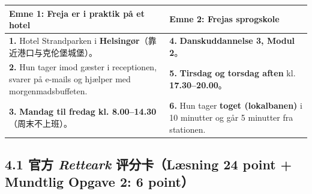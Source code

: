 \begin{tcolorbox}[enhanced, unbreakable, colback=NCDBgGray, colframe=NCDGray, coltitle=white, fonttitle=\bfseries, title={Kursist B Ark — Case: Freja（回答方专用 · 事实信息卡片，请遮盖 A 卡作答）}, arc=2pt, boxrule=0.8pt, borderline west={3pt}{0pt}{NCDRed}, left=10pt, right=10pt, top=7pt, bottom=7pt]
\small
\renewcommand{\arraystretch}{1.3}
\begin{tabularx}{\linewidth}{@{} >{\raggedright\arraybackslash}X @{\hspace{0.5cm}} >{\raggedright\arraybackslash}X @{}}
\toprule
\textbf{\color{NCDTeal}Emne 1: Freja er i praktik på et hotel} & \textbf{\color{NCDTeal}Emne 2: Frejas sprogskole} \\
\midrule
\textbf{1.} Hotel Strandparken i \textbf{Helsingør}（靠近港口与克伦堡城堡）。 &
\textbf{4.} \textbf{Danskuddannelse 3, Modul 2}。 \\
\midrule
\textbf{2.} Hun tager imod gæster i receptionen, svarer på e-mails og hjælper med morgenmadsbuffeten. &
\textbf{5.} \textbf{Tirsdag og torsdag aften} kl. \textbf{17.30--20.00}。 \\
\midrule
\textbf{3.} \textbf{Mandag til fredag kl. 8.00--14.30}（周末不上班）。 &
\textbf{6.} Hun tager \textbf{toget (lokalbanen)} i 10 minutter og går 5 minutter fra stationen. \\
\bottomrule
\end{tabularx}
\end{tcolorbox}

\clearpage
{}

\subsection*{4.1 官方 \textit{Retteark} 评分卡（Læsning 24 point + Mundtlig Opgave 2: 6 point）}

